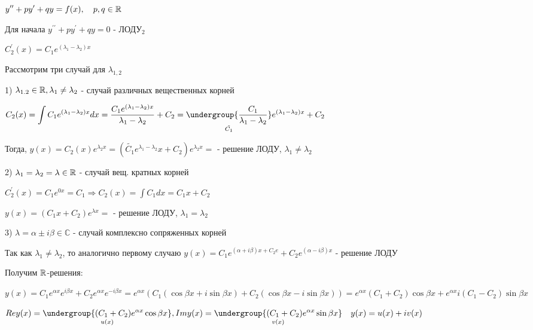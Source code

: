 \documentclass[12pt]{article}
\begin{document}
    \Mem $\displaystyle y^{\prime\prime} + py^\prime + qy = f(x), \quad p, q \in \mathbb{R}$

    Для начала $\displaystyle y^{\prime\prime} + py^\prime + qy = 0$ - ЛОДУ$\displaystyle _2$

    $\displaystyle C^\prime_2 (x) = C_1 e^{(\lambda_1 - \lambda_2)x}$

    Рассмотрим три случай для $\displaystyle \lambda_{1,2}$

    1) $\displaystyle \lambda_{1.2} \in \mathbb{R}, \lambda_1 \neq \lambda_2$ - случай различных вещественных корней

    $\displaystyle C_2(x) = \int C_1 e^{(\lambda_1 - \lambda_2)x} dx = \frac{C_1 e^{(\lambda_1 - \lambda_2)x}}{\lambda_1 - \lambda_2} + C_2 =
    \underset{\tilde{C_1}}{\undergroup{\frac{C_1}{\lambda_1 - \lambda_2}}} e^{(\lambda_1 - \lambda_2)x} + C_2$

    Тогда, $\displaystyle y(x) = C_2(x) e^{\lambda_2 x} = (\tilde{C_1}e^{\lambda_1 - \lambda_2}x + C_2)e^{\lambda_2 x} = $ - решение ЛОДУ, $\displaystyle \lambda_1 \neq \lambda_2$

    2) $\displaystyle \lambda_1 = \lambda_2 = \lambda \in \mathbb{R}$ - случай вещ. кратных корней

    $\displaystyle C_2^\prime (x) = C_1 e^{0x} = C_1 \Longrightarrow C_2(x) = \int C_1 dx = C_1 x + C_2$

    $\displaystyle y(x) = (C_1 x + C_2)e^{\lambda x} = $ - решение ЛОДУ, $\displaystyle \lambda_1 = \lambda_2$

    3) $\lambda = \alpha \pm i \beta \in \mathbb{C}$ - случай комплексно сопряженных корней

    Так как $\displaystyle \lambda_1 \neq \lambda_2$, то аналогично первому случаю $\displaystyle y(x) = C_1 e^{(\alpha + i \beta)x + C_2 e} + C_2 e^{(\alpha - i \beta) x}$ - решение ЛОДУ

    Получим $\mathbb{R}$-решения:

    $\displaystyle y(x) = C_1 e^{\alpha x} e^{i\beta x} + C_2 e^{\alpha x} e^{-i\beta x} = e^{\alpha x} (C_1 (\cos\beta x + i\sin\beta x) + C_2 (\cos\beta x - i\sin \beta x)) =
    e^{\alpha x} (C_1 + C_2) \cos\beta x + e^{\alpha x} i (C_1 - C_2) \sin\beta x$

    $\displaystyle Re y(x) = \underset{u(x)}{\undergroup{(C_1 + C_2) e^{\alpha x} \cos\beta x}}, Im y(x) = \underset{v(x)}{\undergroup{(C_1 + C_2) e^{\alpha x} \sin\beta x}} \quad y(x) = u(x) + iv(x)$
\end{document}
